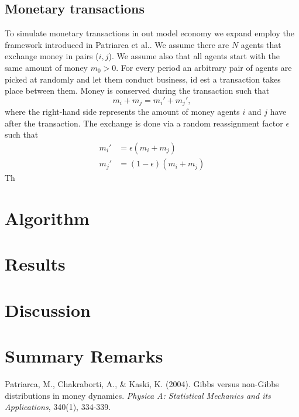 \documentclass[10pt, a4paper]{amsart}
\begin{document}
\subsection{Monetary transactions}
To simulate monetary transactions in out model economy we expand employ the framework introduced in Patriarca et al.\cite{Patriarca}. We assume there are $N$ agents that exchange money in pairs ($i,j$). We assume also that all agents start with the same amount of money $m_0>0$. For every period an arbitrary pair of agents are picked at randomly and let them conduct business, id est a transaction takes place between them. Money is conserved during the transaction such that
\begin{equation}
m_i + m_j = m_i' + m_j',
\end{equation}
where the right-hand side represents the amount of money agents $i$ and $j$ have after the transaction. The exchange is done via a random reassignment factor $\epsilon$ such that
\begin{align}
m_i' &= \epsilon (m_i + m_j) \\
m_j' &= (1 - \epsilon) (m_i + m_j)
\end{align}
Th


\section{Algorithm}

\section{Results}

\section{Discussion}

\section{Summary Remarks}


\begin{thebibliography}{10}

 Patriarca, M., Chakraborti, A., \& Kaski, K. (2004). 
	Gibbs versus non-Gibbs distributions in money dynamics. 
	\emph{Physica A: Statistical Mechanics and its Applications},
	340(1), 334-339.

\end{thebibliography}
\end{document}
